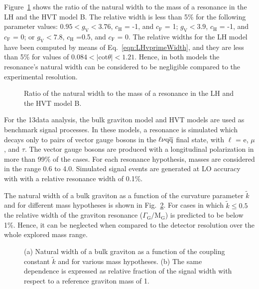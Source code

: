 Figure~\ref{fig:WHmodelsWidth} shows the ratio of the natural width to the mass of a \Wpr resonance in the LH and the HVT model B.
The relative width is less than 5\% for the following parameter values:
$0.95 < g_\mathrm{V} < 3.76$, $c_\mathrm{H}$ = -1, and $c_\mathrm{F}$ = 1;
$g_\mathrm{V} < 3.9$, $c_\mathrm{H}$ = -1, and $c_\mathrm{F}$ = 0;
or $g_\mathrm{V} < 7.8$, $c_\mathrm{H}$ =0.5, and $c_\mathrm{F}$ = 0.
The relative widths for the LH model have been computed by means of Eq.~\ref{eqn:LHvprimeWidth}, and they are less than 5\%
for values of $0.084 < |\mathrm{cot}\theta| < 1.21$. Hence, in both models the resonance's natural width can be considered to be negligible compared to the experimental resolution.\\

\begin{figure}[!htb]
\centering
{}
\caption{Ratio of the natural width to the mass of a \Wpr resonance in the LH and the HVT model B.}
\label{fig:WHmodelsWidth}
\end{figure}

For the 13\TeV data analysis, the bulk graviton model and HVT models are used as benchmark signal processes.
In these models, a resonance is simulated which decays only to pairs of vector gauge bosons in the $\ell\nu\mathrm{q}\overline{\mathrm{q}}$ final state, with $\ell$ = e, $\mu$, and $\tau$.
The vector gauge bosons are produced with a longitudinal polarization in more than 99\% of the cases.
For each resonance hypothesis, masses are considered in the range 0.6 to 4.0\TeV.
Simulated signal events are generated at LO accuracy with \amcatnlo{} with a relative resonance width of 0.1\%.

The natural width of a bulk graviton as a function of the curvature parameter $\tilde{k}$ and for different mass hypotheses is shown in Fig.~\ref{fig:bulkGwidth}.
For cases in which $\tilde{k} \leq 0.5$ the relative width of the graviton resonance ($\Gamma_\mathrm{G}/\mathrm{M}_\mathrm{G}$)
is predicted to be below 1\%. Hence, it can be neglected when compared to the detector resolution over the whole explored mass range.

\begin{figure}[!htb]
\centering
{}
\caption{(a) Natural width of a bulk graviton as a function of the coupling constant $\tilde{k}$ and for various mass hypotheses. (b) The same dependence is expressed as relative fraction of the signal width with respect to a reference graviton mass of 1\TeV.}
\label{fig:bulkGwidth}
\end{figure}

